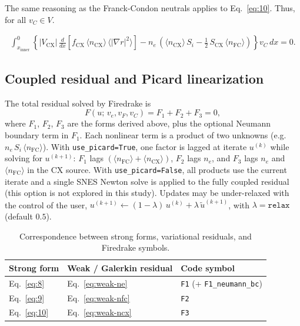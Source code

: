 \documentclass[twocolumn,secnumarabic,amssymb, nobibnotes, aps, prd]{revtex4-2}
\begin{document}
The same reasoning as the Franck-Condon neutrals applies to Eq.~\eqref{eq:10}.
Thus, for all $v_C \in V$.
\begin{widetext}
\begin{align}
  \int_{x_{\mathrm{inner}}}^{0}
    \left\{
      |V_{\mathrm{CX}}|\,\frac{d}{dx}\!\left[f_{\mathrm{CX}}\,\langle n_{\mathrm{CX}}\rangle\,\langle|\nabla r|^{2}\rangle\right]
      - n_e\,\left(\langle n_{\mathrm{CX}}\rangle\,S_i - \tfrac{1}{2}\,S_{\mathrm{CX}}\,\langle n_{\mathrm{FC}}\rangle\right)
    \right\} v_C \, dx = 0.
  \label{eq:weak-ncx}
\end{align}
\end{widetext}

\subsection{Coupled residual and Picard linearization}
\label{sec:coupled}

The total residual solved by Firedrake is
\begin{equation}
  F(u;\,v_e,v_F,v_C) = F_1 + F_2 + F_3 = 0,
  \label{eq:total-F}
\end{equation}
where $F_1$, $F_2$, $F_3$ are the forms derived above, plus the optional
Neumann boundary term in $F_1$.
Each nonlinear term is a product of two unknowns
(e.g.\ $n_e\,S_i\,\langle n_{\mathrm{FC}}\rangle$).
With \texttt{use\_picard=True}, one factor is lagged at iterate $u^{(k)}$
while solving for $u^{(k+1)}$:
$F_1$ lags $(\langle n_{\mathrm{FC}}\rangle+\langle n_{\mathrm{CX}}\rangle)$,
$F_2$ lags $n_e$, and $F_3$ lags $n_e$ and $\langle n_{\mathrm{FC}}\rangle$
in the CX source.
With \texttt{use\_picard=False}, all products use the current iterate and a single SNES Newton solve is applied to the fully coupled residual (this option is not explored in this study).
Updates may be under-relaxed with the control of the user,
$u^{(k+1)} \leftarrow (1-\lambda)\,u^{(k)} + \lambda\,\tilde u^{(k+1)}$,
with $\lambda=\texttt{relax}$ (default $0.5$).


\begin{table}[t]
\caption{\label{tab:code-map}Correspondence between strong forms, variational residuals, and Firedrake symbols.}
\begin{ruledtabular}
\begin{tabular}{lll}
Strong form & Weak / Galerkin residual & Code symbol \\
\hline
Eq.~\eqref{eq:8} & Eq.~\eqref{eq:weak-ne} & \texttt{F1} (+ \texttt{F1\_neumann\_bc}) \\
Eq.~\eqref{eq:9} & Eq.~\eqref{eq:weak-nfc} & \texttt{F2} \\
Eq.~\eqref{eq:10} & Eq.~\eqref{eq:weak-ncx} & \texttt{F3} \\
\end{tabular}
\end{ruledtabular}
\end{table}
\end{document}
